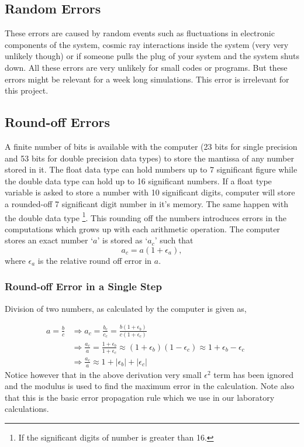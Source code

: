\documentclass[a4,12pt]{article}
\numberwithin{equation}{subsection}
\begin{document}
\subsection{Random Errors}
These errors are caused by random events such as fluctuations in electronic components of the system, cosmic ray interactions inside the system (very very unlikely though) or if someone pulls the plug of your system and the system shuts down. All these errors are very unlikely for small codes or programs. But these errors might be relevant for a week long simulations. This error is irrelevant for this project.

\subsection{Round-off Errors}
A finite number of bits is available with the computer (23 bits for single precision and 53 bits for double precision data types) to store the mantissa of any number stored in it. The float data type can hold numbers up to 7 significant figure while the double data type can hold up to 16 significant numbers. If a float type variable is asked to store a number with 10 significant digits, computer will store a rounded-off 7 significant digit number in it's memory. The same happen with the double data type \footnote[1]{If the significant digits of number is greater than 16.}. This rounding off the numbers introduces errors in the computations which grows up with each arithmetic operation. The computer stores an exact number `$a$' is stored as `$a_c$' such that 
$$a_c = a(1+\epsilon_a),$$
where $\epsilon_a$ is the relative round off error in $a$. 

\subsubsection{Round-off Error in a Single Step}
Division of two numbers, as calculated by the computer is given as,

\begin{align}
a=\frac{b}{c} & \Rightarrow a_c = \frac{b_c}{c_c} = \frac{b(1+\epsilon_b)}{c(1+\epsilon_c)} && \\
& \Rightarrow \frac{a_c}{a} = \frac{1+\epsilon_b}{1+\epsilon_c} \approx (1+\epsilon_b)(1-\epsilon_c) \approx 1+ \epsilon_b - \epsilon_c &&\\
& \Rightarrow \frac{a_c}{a} \approx 1 + |\epsilon_b| + |\epsilon_c| &&
\end{align}
Notice however that in the above derivation very small $\epsilon^2$ term has been ignored and the modulus is used to find the maximum error in the calculation. Note also that this is the basic error propagation rule which we use in our laboratory calculations.
\end{document}
